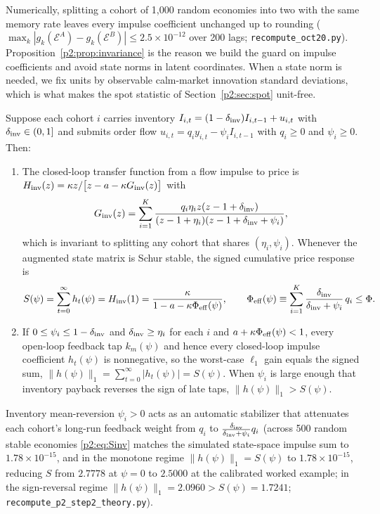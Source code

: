 Numerically, splitting a cohort of 1{,}000 random economies into two with the same memory rate leaves every impulse coefficient unchanged up to rounding ($\max_k|g_k(\mathcal E^A)-g_k(\mathcal E^B)|\le2.5\times10^{-12}$ over 200 lags; \texttt{recompute\_oct20.py}). Proposition~\ref{p2:prop:invariance} is the reason we build the guard on impulse coefficients and avoid state norms in latent coordinates. When a state norm is needed, we fix units by observable calm-market innovation standard deviations, which is what makes the spot statistic of Section~\ref{p2:sec:spot} unit-free.

\begin{proposition}\label{p2:prop:inventory_S}
Suppose each cohort $i$ carries inventory $I_{i,t}=(1-\delta_{\rm inv})I_{i,t-1}+u_{i,t}$ with $\delta_{\rm inv}\in(0,1]$ and submits order flow $u_{i,t}=q_i y_{i,t}-\psi_i I_{i,t-1}$ with $q_i\ge0$ and $\psi_i\ge0$. Then:
\begin{enumerate}[label=(\roman*)]
\item The closed-loop transfer function from a flow impulse to price is $H_{\rm inv}(z)=\kappa z/\bigl[z-a-\kappa G_{\rm inv}(z)\bigr]$ with
\[
G_{\rm inv}(z)=\sum_{i=1}^K \frac{q_i\eta_i z(z-1+\delta_{\rm inv})}{(z-1+\eta_i)(z-1+\delta_{\rm inv}+\psi_i)},
\]
which is invariant to splitting any cohort that shares $(\eta_i,\psi_i)$. Whenever the augmented state matrix is Schur stable, the signed cumulative price response is
\begin{equation}\label{p2:eq:Sinv}
S(\psi)=\sum_{t=0}^\infty h_t(\psi)=H_{\rm inv}(1)=\frac{\kappa}{1-a-\kappa\Phi_{\rm eff}(\psi)},\qquad \Phi_{\rm eff}(\psi)\equiv\sum_{i=1}^K\frac{\delta_{\rm inv}}{\delta_{\rm inv}+\psi_i}\,q_i\le\Phi.
\end{equation}
\item If $0\le\psi_i\le 1-\delta_{\rm inv}$ and $\delta_{\rm inv}\ge\eta_i$ for each $i$ and $a+\kappa\Phi_{\rm eff}(\psi)<1$, every open-loop feedback tap $k_m(\psi)$ and hence every closed-loop impulse coefficient $h_t(\psi)$ is nonnegative, so the worst-case $\ell_1$ gain equals the signed sum, $\|h(\psi)\|_1=\sum_{t=0}^\infty |h_t(\psi)|=S(\psi)$. When $\psi_i$ is large enough that inventory payback reverses the sign of late taps, $\|h(\psi)\|_1>S(\psi)$.
\end{enumerate}
\end{proposition}

Inventory mean-reversion $\psi_i>0$ acts as an automatic stabilizer that attenuates each cohort's long-run feedback weight from $q_i$ to $\frac{\delta_{\rm inv}}{\delta_{\rm inv}+\psi_i}q_i$ (across 500 random stable economies \eqref{p2:eq:Sinv} matches the simulated state-space impulse sum to $1.78\times10^{-15}$, and in the monotone regime $\|h(\psi)\|_1=S(\psi)$ to $1.78\times10^{-15}$, reducing $S$ from $2.7778$ at $\psi=0$ to $2.5000$ at the calibrated worked example; in the sign-reversal regime $\|h(\psi)\|_1=2.0960>S(\psi)=1.7241$; \texttt{recompute\_p2\_step2\_theory.py}).

